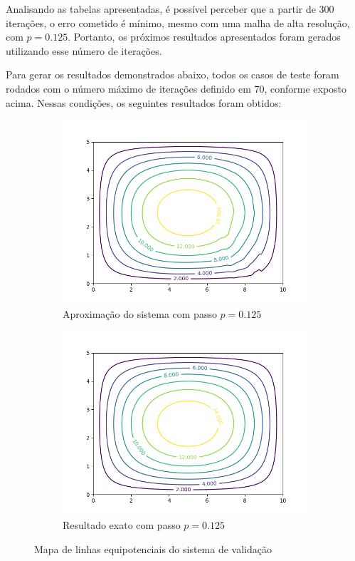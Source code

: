 \documentclass[oneside]{abntex2}
\begin{document}
\newpage

Analisando as tabelas apresentadas, é possível perceber que a partir de 300 iterações, o erro cometido é mínimo, mesmo com uma malha de alta resolução, com $p=0.125$. Portanto, os próximos resultados apresentados foram gerados utilizando esse número de iterações.

Para gerar os resultados demonstrados abaixo, todos os casos de teste foram rodados com o número máximo de iterações definido em 70, conforme exposto acima. Nessas condições, os seguintes resultados foram obtidos:

\begin{figure}[h]
  \begin{subfigure}[b]{0.5\textwidth}
    \includegraphics[width=\textwidth]{imgs/cont_aprox_val_1250.png}
    \caption{Aproximação do sistema com passo $p = 0.125$}
    \label{cont_aprox_val_1250}
  \end{subfigure}
  \begin{subfigure}[b]{0.5\textwidth}
    \includegraphics[width=\textwidth]{imgs/cont_grnd_val_1250.png}
    \caption{Resultado exato com passo $p = 0.125$}
    \label{cont_exat_val_1250}
  \end{subfigure}
  \caption{Mapa de linhas equipotenciais do sistema de validação}
\end{figure}
\end{document}
